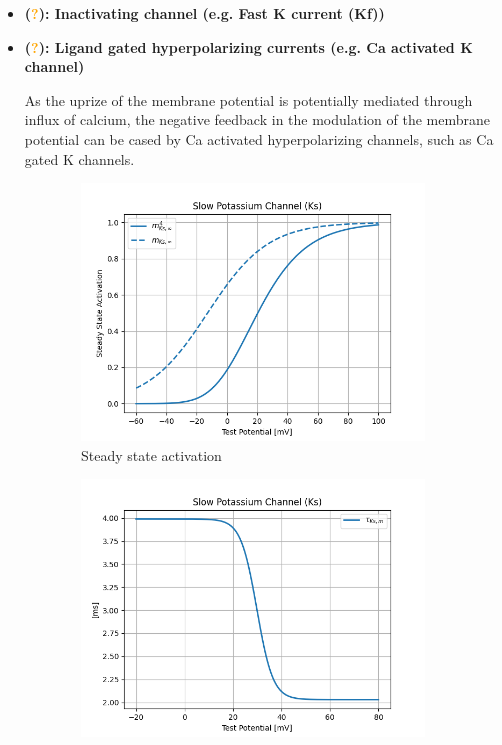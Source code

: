 \documentclass[11pt]{article}
\begin{document}
\begin{itemize}
\begin{itemize}
        \item \textbf{(\textcolor{orange}{?}): Inactivating channel (e.g. Fast K current (Kf))}
        
        \item \textbf{(\textcolor{orange}{?}): Ligand gated hyperpolarizing currents (e.g. Ca activated K channel)}
        
        As the uprize of the membrane potential is potentially mediated through influx of calcium, the negative
        feedback in the modulation of the membrane potential can be cased by Ca activated hyperpolarizing channels,
        such as Ca gated K channels.

    \end{itemize}
\end{itemize}

\begin{figure}[H]
    \centering
    \begin{subfigure}[t]{0.48\textwidth}
        \centering
        \includegraphics[width=\textwidth]{./img/2025_01_23/Ks_channel_steady_state_activation.png}
        \caption{Steady state activation}
        \label{fig_ks_steady_state_activation}
    \end{subfigure}
    \hfill
    \begin{subfigure}[t]{0.48\textwidth}
        \centering
        \includegraphics[width=\textwidth]{./img/2025_01_23/Ks_channel_tau_m.png}

\end{subfigure}
\end{figure}
\end{document}
